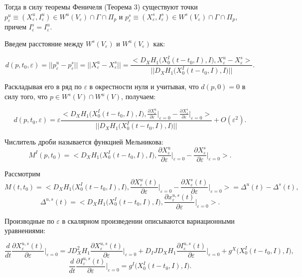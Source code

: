Тогда в силу теоремы Феничеля (Теорема 3) существуют точки $p_\varepsilon^u \equiv (X_\varepsilon^u, I_\varepsilon^u) \in W^{u}(V_\varepsilon) \cap \Gamma \cap \Pi_p$ и $p_\varepsilon^s \equiv (X_\varepsilon^s, I_\varepsilon^s) \in W^{s}(V_\varepsilon) \cap \Gamma \cap \Pi_p$, причем $I_\varepsilon^s = I_\varepsilon^u$.  

Введем расстояние между $W^s(V_\varepsilon)$ и $W^u(V_\varepsilon)$ как:

$$d(p,t_0, \varepsilon) = ||p_\varepsilon^u - p_\varepsilon^s|| = ||X_\varepsilon^u - X_\varepsilon^s|| = \frac{<D_X H_1 \big(X_0^I(t-t_0,I),I \big),X_\varepsilon^u - X_\varepsilon^s>}{||D_X H_1 \big(X_0^I(t-t_0,I), I \big)||}.$$

Раскладывая его в ряд по $\varepsilon$ в окрестности нуля и учитывая, что $d(p,0) = 0$ в силу того, что $p \in W^s(V) \cap W^u(V)$, получаем:

$$d(p,t_0, \varepsilon) = \varepsilon \frac{<D_X H_1 \big(X_0^I(t-t_0,I),I \big), \frac{\partial X_\varepsilon^u}{\partial \varepsilon}\big|_{\varepsilon = 0} - \frac{\partial X_\varepsilon^s}{\partial \varepsilon}\big|_{\varepsilon = 0}>}{||D_X H_1 \big( X_0^I(t-t_0,I), I \big)||} + O(\varepsilon^2).$$

Числитель дроби называется функцией Мельникова:
$$M^I(p,t_0) = <D_X H_1 \big(X_0^I(t-t_0,I),I \big), \frac{\partial X_\varepsilon^u}{\partial \varepsilon} \Big|_{\varepsilon = 0} - \frac{\partial X_\varepsilon^s}{\partial \varepsilon}\Big|_{\varepsilon = 0}>.$$

Рассмотрим 
$$M(t,t_0) = <D_X H_1 \big(X_0^I(t-t_0,I),I \big), \frac{\partial X_\varepsilon^u(t)}{\partial \varepsilon}\Big|_{\varepsilon = 0} - \frac{\partial X_\varepsilon^s(t)}{\partial \varepsilon}\Big|_{\varepsilon = 0}> = \Delta^u(t) - \Delta^s(t),$$
$$\Delta^{u,s}(t) = <D_X H_1 \big(X_0^I(t-t_0,I),I \big), \frac{\partial x_\varepsilon^{u,s}(t)}{\partial \varepsilon}\Big|_{\varepsilon = 0}>.$$

Производные по $\varepsilon$ в скалярном произведении описываются вариационными уравнениями:

$$\frac{d}{dt} \frac{\partial X_\varepsilon^{u,s}(t)}{\partial \varepsilon}\Big|_{\varepsilon = 0} = J D_X^2 H_1 \frac{\partial X_\varepsilon^{u,s}(t)}{\partial \varepsilon}\Big|_{\varepsilon = 0} + D_I J D_X H_1 \frac{\partial I_\varepsilon^{u,s}(t)}{\partial \varepsilon}\Big|_{\varepsilon = 0} + g^X \big(X_0^I(t-t_0,I), I \big),$$
$$\frac{d}{dt} \frac{\partial I_\varepsilon^{u,s}(t)}{\partial \varepsilon}\Big|_{\varepsilon = 0} = g^I \big(X_0^I(t-t_0,I), I \big).$$

